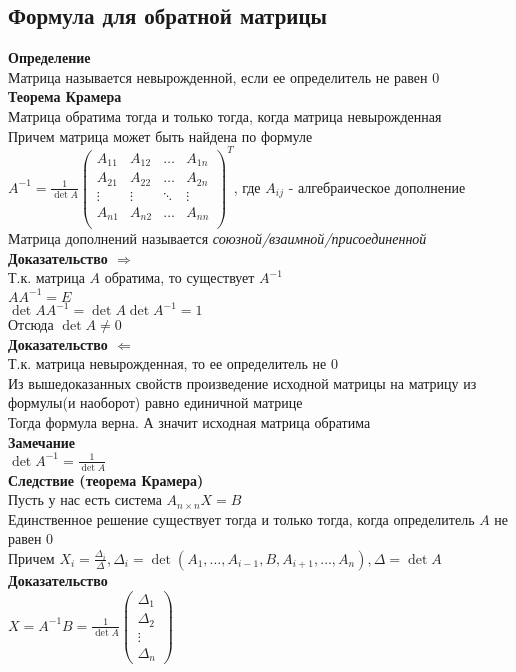 \documentclass[12pt]{article}
\begin{document}
\subsection{Формула для обратной матрицы}
\textbf{Определение}\\
Матрица называется невырожденной, если ее определитель не равен 0\\
\textbf{Теорема Крамера}\\
Матрица обратима тогда и только тогда, когда матрица невырожденная\\
Причем матрица может быть найдена по формуле $A^{-1} = \frac{1}{\det A}\begin{pmatrix}
    A_{11} & A_{12} & \ldots & A_{1n}\\
    A_{21} & A_{22} & \ldots & A_{2n}\\
    \vdots & \vdots & \ddots & \vdots\\
    A_{n1} & A_{n2} & \ldots & A_{nn}\\
\end{pmatrix}^T$, где $A_{ij}$ - алгебраическое дополнение\\
Матрица дополнений называется \textit{союзной/взаимной/присоединенной}\\
\textbf{Доказательство $\Rightarrow$}\\
Т.к. матрица $A$ обратима, то существует $A^{-1}$\\
$AA^{-1} = E$\\
$\det AA^{-1} = \det A \det A^{-1} = 1$\\
Отсюда $\det A \neq 0$\\
\textbf{Доказательство $\Leftarrow$}\\
Т.к. матрица невырожденная, то ее определитель не 0\\
Из вышедоказанных свойств произведение исходной матрицы на матрицу из формулы(и наоборот) равно единичной матрице\\
Тогда формула верна. А значит исходная матрица обратима\\
\textbf{Замечание}\\
$\det A^{-1} = \frac{1}{\det A}$\\
\textbf{Следствие (теорема Крамера)}\\
Пусть у нас есть система $A_{n\times n}X = B$\\
Единственное решение существует тогда и только тогда, когда определитель $A$ не равен 0\\
Причем $X_i = \frac{\Delta_i}{\Delta}, \Delta_i = \det (A_1, \ldots, A_{i-1}, B, A_{i+1}, \ldots, A_n), \Delta = \det A$\\
\textbf{Доказательство}\\
$X = A^{-1}B = \frac{1}{\det A}\begin{pmatrix}
    \Delta_1\\
    \Delta_2\\
    \vdots\\
    \Delta_n
\end{pmatrix}$
\end{document}
